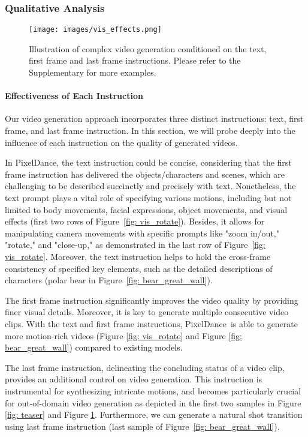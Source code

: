 \documentclass[10pt,twocolumn,letterpaper]{article}
\newcommand{\tcb}{\textcolor{black}}
\newcommand{\ours}{{PixelDance}}
\begin{document}
\subsubsection{Qualitative Analysis} 
\label{sec: analysis}


\begin{figure}[t]
  \centering
  \texttt{[image: images/vis\_effects.png]}
  \caption{
  Illustration of complex video generation conditioned on the text, first frame and last frame instructions.  Please refer to the Supplementary for more examples.
  }
  \label{fig: vis_effect}
\end{figure}



\paragraph{Effectiveness of Each Instruction} Our video generation approach incorporates three distinct instructions: text, first frame, and last frame instruction. In this section, we will probe deeply into the influence of each instruction on the quality of generated videos.


In \ours, the text instruction could be concise, considering that the first frame instruction has delivered the objects/characters and scenes, which are challenging to be described succinctly and precisely with text. Nonetheless, the text prompt plays a vital role of specifying various motions, including but not limited to body movements, facial expressions, object movements, and visual effects (first two rows of Figure~\ref{fig: vis_rotate}). Besides, it allows for manipulating camera movements with specific prompts like "zoom in/out," "rotate," and "close-up," as demonstrated in the last row of Figure~\ref{fig: vis_rotate}. Moreover, the text instruction helps to hold the cross-frame consistency of specified key elements, such as the detailed descriptions of characters (polar bear in Figure~\ref{fig: bear_great_wall}).



The first frame instruction significantly improves the video quality by providing finer visual details. Moreover, it is key to generate multiple consecutive video clips. With the text and first frame instructions, \ours~is able to generate more motion-rich videos (Figure \ref{fig: vis_rotate} and Figure \ref{fig: bear_great_wall}) \tcb{compared to existing models.}


The last frame instruction, delineating the concluding status of a video clip, provides an additional control on video generation. This instruction is instrumental for synthesizing intricate motions, and becomes particularly crucial for out-of-domain video generation as depicted in the first two samples in Figure \ref{fig: teaser} and Figure \ref{fig: vis_effect}. 
Furthermore, we can generate a natural shot transition using last frame instruction (last sample of Figure~\ref{fig: bear_great_wall}).
\end{document}

